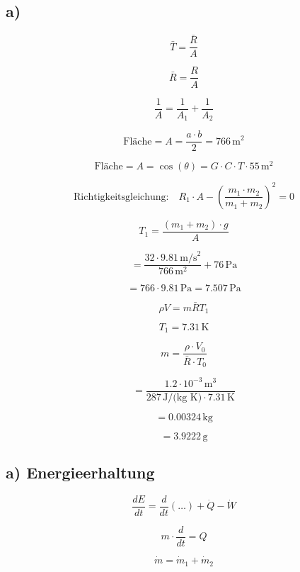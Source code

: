 

\subsection*{a)}

\[
\bar{T} = \frac{\bar{R}}{A}
\]

\[
\bar{R} = \frac{R}{A}
\]

\[
\frac{1}{A} = \frac{1}{A_1} + \frac{1}{A_2}
\]

\[
\text{Fläche} = A = \frac{a \cdot b}{2} = 766 \, \text{m}^2
\]

\[
\text{Fläche} = A = \cos(\theta) = G \cdot C \cdot T \cdot 55 \, \text{m}^2
\]

\[
\text{Richtigkeitsgleichung:} \quad R_1 \cdot A - \left( \frac{m_1 \cdot m_2}{m_1 + m_2} \right)^2 = 0
\]

\[
T_1 = \frac{(m_1 + m_2) \cdot g}{A}
\]

\[
= \frac{32 \cdot 9.81 \, \text{m/s}^2}{766 \, \text{m}^2} + 76 \, \text{Pa}
\]

\[
= 766 \cdot 9.81 \, \text{Pa} = 7.507 \, \text{Pa}
\]

\[
\rho V = m \bar{R} T_1
\]

\[
T_1 = 7.31 \, \text{K}
\]

\[
m = \frac{\rho \cdot V_0}{\bar{R} \cdot T_0}
\]

\[
= \frac{1.2 \cdot 10^{-3} \, \text{m}^3}{287 \, \text{J/(kg K)} \cdot 7.31 \, \text{K}}
\]

\[
= 0.00324 \, \text{kg}
\]

\[
= 3.9222 \, \text{g}
\]

\subsection*{a) Energieerhaltung}

\[
\frac{dE}{dt} = \frac{d}{dt} \left( \ldots \right) + \dot{Q} - \dot{W}
\]

\[
m \cdot \frac{d}{dt} = Q
\]

\[
\dot{m} = \dot{m}_1 + \dot{m}_2
\]